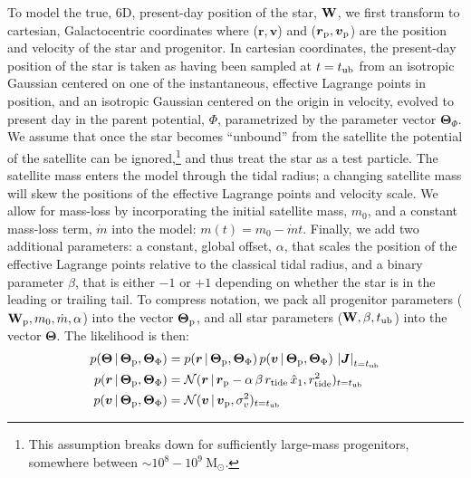 \documentclass[letterpaper,12pt,preprint]{aastex}
\newcommand{\given}{\,|\,}
\newcommand{\W}{{\bf W}}
\newcommand{\J}{{\boldsymbol J}}
\newcommand{\rtide}{r_{\rm tide}}
\newcommand{\bs}{\boldsymbol}
\newcommand{\sat}{{\rm p}}
\newcommand{\tub}{t_{\rm ub}}
\newcommand{\tailbit}{\beta}
\newcommand{\Loffset}{\alpha}
\begin{document}
To model the true, 6D, present-day position of the star, $\W$, we first transform to cartesian, Galactocentric coordinates where ($\bs{r},\bs{v}$) and ($\bs{r}_\sat,\bs{v}_\sat$) are the position and velocity of the star and progenitor. In cartesian coordinates, the present-day position of the star is taken as having been sampled at $t=\tub$ from an isotropic Gaussian centered on one of the instantaneous, effective Lagrange points in position, and an isotropic Gaussian centered on the origin in velocity, evolved to present day in the parent potential, $\Phi$, parametrized by the parameter vector $\bs{\Theta}_\Phi$. We assume that once the star becomes ``unbound'' from the satellite the potential of the satellite can be ignored,\footnote{This assumption breaks down for sufficiently large-mass progenitors, somewhere between $\sim10^8-10^9~$M$_\odot$.} and thus treat the star as a test particle. The satellite mass enters the model through the tidal radius; a changing satellite mass will skew the positions of the effective Lagrange points and velocity scale. We allow for mass-loss by incorporating the initial satellite mass, $m_0$, and a constant mass-loss term, $\dot{m}$ into the model: $m(t) = m_0 - \dot{m}t$. Finally, we add two additional parameters: a constant, global offset, $\Loffset$, that scales the position of the effective Lagrange points relative to the classical tidal radius, and a binary parameter $\tailbit$, that is either $-1$ or $+1$ depending on whether the star is in the leading or trailing tail. To compress notation, we pack all progenitor parameters ($\W_\sat, m_0, \dot{m}, \Loffset$) into the vector $\bs{\Theta}_\sat$, and all star parameters ($\W, \tailbit, \tub$) into the vector $\bs{\Theta}$. The likelihood is then:
\begin{align}
	p(\bs{\Theta} \given \bs{\Theta}_\sat, \bs{\Theta}_\Phi) &= p(\bs{r} \given \bs{\Theta}_\sat, \bs{\Theta}_\Phi)\,p(\bs{v} \given\bs{\Theta}_\sat, \bs{\Theta}_\Phi)\,\left\vert\J\right\vert_{t=\tub}\label{eq:starlike}\\
	p(\bs{r} \given \bs{\Theta}_\sat, \bs{\Theta}_\Phi) &= \mathcal{N}(\bs{r} \given \bs{r}_\sat - \Loffset\,\tailbit\,\rtide\,\hat{x}_1, \rtide^2)_{t=\tub}\\
	p(\bs{v} \given \bs{\Theta}_\sat, \bs{\Theta}_\Phi) &= \mathcal{N}(\bs{v} \given \bs{v}_\sat, \sigma^2_v)_{t=\tub}
\end{align}
\end{document}
